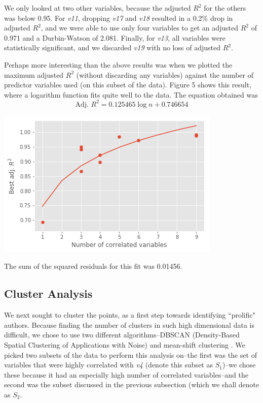 \documentclass[12pt,a4paper,twocolumn]{article}
\begin{document}
We only looked at two other variables, because the adjusted $R^2$ for the others was below 0.95. For \textit{v11}, dropping \textit{v17} and \textit{v18} resulted in a 0.2\% drop in adjusted $R^2$, and we were able to use only four variables to get an adjusted $R^2$ of 0.971 and a Durbin-Watson of 2.081. Finally, for \textit{v13}, all variables were statistically significant, and we discarded \textit{v19} with no loss of adjusted $R^2$.

Perhaps more interesting than the above results was when we plotted the maximum adjusted $R^2$ (without discarding any variables) against the number of predictor variables used (on this subset of the data). Figure 5 shows this result, where a logarithm function fits quite well to the data. The equation obtained was
\begin{equation}
	\text{Adj. } R^2 = 0.125465 \log n + 0.746654
\end{equation}

\includegraphics[scale=0.5]{fig5.png}
\begingroup
{}
\endgroup
\hfill\break

The sum of the squared residuals for this fit was 0.01456.

\subsection{Cluster Analysis}
We next sought to cluster the points, as a first step towards identifying ``prolific" authors. Because finding the number of clusters in such high dimensional data is difficult, we chose to use two different algorithms--DBSCAN (Density-Based Spatial Clustering of Applications with Noise)\cite{ester1996density} and mean-shift clustering \cite{comaniciu2002mean}. We picked two subsets of the data to perform this analysis on--the first was the set of variables that were highly correlated with \textit{v4} (denote this subset as $S_1$)--we chose these because it had an especially high number of correlated variables--and the second was the subset discussed in the previous subsection (which we shall denote as $S_2$.
\end{document}
